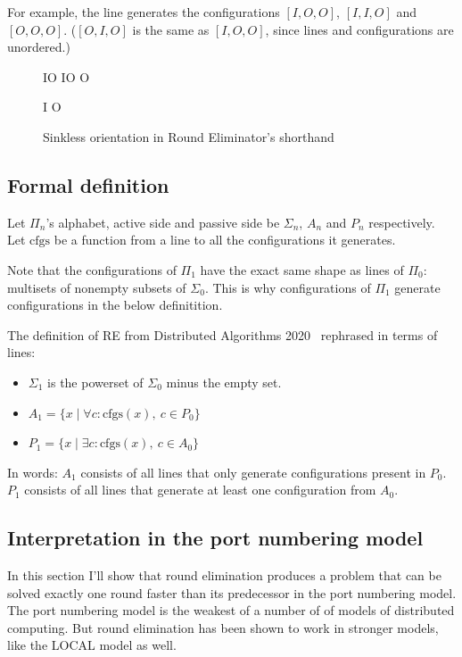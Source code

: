 \documentclass[english, 12pt, a4paper, sci, a-1b, online]{aaltothesis}
\begin{document}
For example, the line  generates the configurations $[I, O, O]$, $[I, I, O]$ and $[O, O, O]$. ($[O, I, O]$ is the same as $[I, O, O]$, since lines and configurations are unordered.)

\begin{figure}[h]
  \centering
  \begin{tcolorbox}[width=.22\textwidth, nobeforeafter, title=active side]
  IO IO O
  \end{tcolorbox}
  \begin{tcolorbox}[width=.22\textwidth, nobeforeafter, title=passive side]
  I O
  \end{tcolorbox}
  \caption{Sinkless orientation in Round Eliminator's shorthand}
\end{figure}

\subsection{Formal definition}

Let $\Pi_n$'s alphabet, active side and passive side be $\Sigma_n$, $A_n$ and $P_{n}$ respectively. Let $\text{cfgs}$ be a function from a line to all the configurations it generates.

Note that the configurations of $\Pi_1$ have the exact same shape as lines of $\Pi_0$: multisets of nonempty subsets of $\Sigma_0$. This is why configurations of $\Pi_1$ generate configurations in the below definitition.

The definition of RE from Distributed Algorithms 2020~\cite{DA2020} rephrased in terms of lines:
\begin{itemize}
  \item $\Sigma_1$ is the powerset of $\Sigma_0$ minus the empty set.
  \item $A_{1} = \{x \mid \forall c : \text{cfgs}(x),\ c \in P_0 \}$
  \item $P_1 = \{x \mid \exists c : \text{cfgs}(x),\ c \in A_0 \}$
\end{itemize}

In words: $A_{1}$ consists of all lines that only generate configurations present in $P_{0}$. $P_1$ consists of all lines that generate at least one configuration from $A_0$.

\subsection{Interpretation in the port numbering model}

In this section I'll show that round elimination produces a problem that can be solved exactly one round faster than its predecessor in the port numbering model. The port numbering model is the weakest of a number of of models of distributed computing. But round elimination has been shown to work in stronger models, like the LOCAL model as well.~\cite{tc3}
\end{document}
